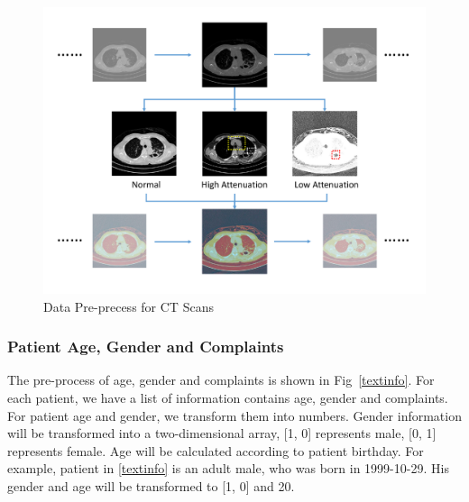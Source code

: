 \documentclass[runningheads]{llncs}
\begin{document}
\begin{figure}[t]
    \centerline{\includegraphics[width=150mm]{3channel.pdf}}
    \vspace{-0cm}
    \caption{Data Pre-precess for CT Scans}
    \vspace{-0cm}
    \label{3channel}
    \end{figure}

\subsubsection{Patient Age, Gender and Complaints}
\label{textdata}
The pre-process of age, gender and complaints is shown in Fig~\ref{textinfo}. For each patient, we have a list of information contains age, gender and complaints. 
For patient age and gender, we transform them into numbers. Gender information will be transformed into a two-dimensional array, [1, 0] represents male, [0, 1] represents female. Age will be calculated according to patient birthday. For example, patient in \ref{textinfo} is an adult male, who was born in 1999-10-29. His gender and age will be transformed to [1, 0] and 20.
\end{document}
